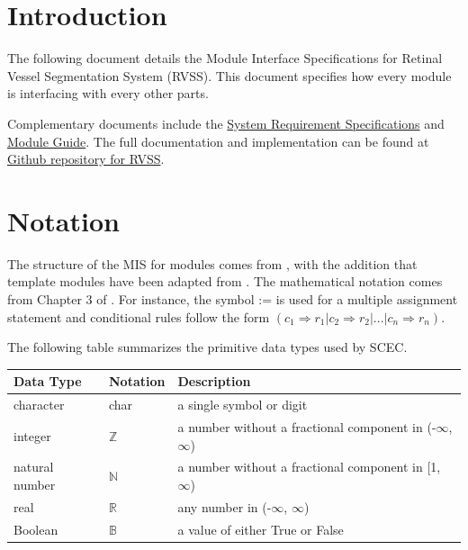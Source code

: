 \documentclass[12pt, titlepage]{article}
\begin{document}
\newpage

\tableofcontents

\listoftables

\newpage


\section{Introduction}

The following document details the Module Interface Specifications for
Retinal Vessel Segmentation System (RVSS). This document specifies how every module is interfacing with every other parts. 

Complementary documents include the \href{https://github.com/lele0007/Blood-vessel-segmentation/blob/main/docs/SRS/SRS.pdf}{System Requirement Specifications}
and \href{https://github.com/lele0007/Blood-vessel-segmentation/blob/main/docs/Design/SoftArchitecture/MG.pdf}{Module Guide}.  The full documentation and implementation can be
found at \href{https://github.com/lele0007/Blood-vessel-segmentation.git}{Github repository for RVSS}.

\section{Notation}


The structure of the MIS for modules comes from \citet{HoffmanAndStrooper1995},
with the addition that template modules have been adapted from
\citet{ghezzi1991fundamentals}.  The mathematical notation comes from Chapter 3 of
\citet{HoffmanAndStrooper1995}.  For instance, the symbol := is used for a
multiple assignment statement and conditional rules follow the form $(c_1
\Rightarrow r_1 | c_2 \Rightarrow r_2 | ... | c_n \Rightarrow r_n )$.

The following table summarizes the primitive data types used by SCEC. 

\begin{center}
\renewcommand{\arraystretch}{1.2}
\noindent 
\begin{tabular}{l l p{7.5cm}} 
\toprule 
\textbf{Data Type} & \textbf{Notation} & \textbf{Description}\\ 
\midrule
character & char & a single symbol or digit\\
integer & $\mathbb{Z}$ & a number without a fractional component in (-$\infty$, $\infty$) \\
natural number & $\mathbb{N}$ & a number without a fractional component in [1, $\infty$) \\
real & $\mathbb{R}$ & any number in (-$\infty$, $\infty$)\\
Boolean & $\mathbb{B}$ & a value of either True or False\\
\bottomrule
\end{tabular} 
\end{center}
\end{document}
